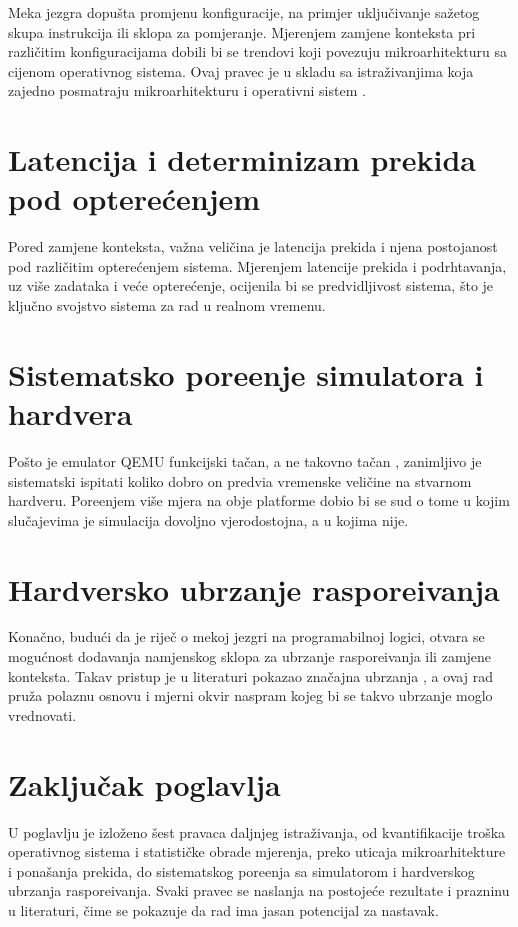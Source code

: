Meka jezgra dopu\v{s}ta promjenu konfiguracije, na primjer uklju\v{c}ivanje
sa\v{z}etog skupa instrukcija ili sklopa za pomjeranje. Mjerenjem zamjene
konteksta pri razli\v{c}itim konfiguracijama dobili bi se trendovi koji povezuju
mikroarhitekturu sa cijenom operativnog sistema. Ovaj pravec je u skladu sa
istra\v{z}ivanjima koja zajedno posmatraju mikroarhitekturu i operativni sistem
\citep{scheck2026coexploration}.

\section{Latencija i determinizam prekida pod optere\'cenjem}
\label{sec:pravci-prekidi}

Pored zamjene konteksta, va\v{z}na veli\v{c}ina je latencija prekida i njena
postojanost pod razli\v{c}itim optere\'cenjem sistema. Mjerenjem latencije
prekida i podrhtavanja, uz vi\v{s}e zadataka i ve\'ce optere\'cenje, ocijenila bi
se predvidljivost sistema, \v{s}to je klju\v{c}no svojstvo sistema za rad u
realnom vremenu.

\section{Sistematsko pore\dj{}enje simulatora i hardvera}
\label{sec:pravci-qemu}

Po\v{s}to je emulator QEMU funkcijski ta\v{c}an, a ne takovno ta\v{c}an
\citep{qemu}, zanimljivo je sistematski ispitati koliko dobro on predvi\dj{}a
vremenske veli\v{c}ine na stvarnom hardveru. Pore\dj{}enjem vi\v{s}e mjera na obje
platforme dobio bi se sud o tome u kojim slu\v{c}ajevima je simulacija dovoljno
vjerodostojna, a u kojima nije.

\section{Hardversko ubrzanje raspore\dj{}ivanja}
\label{sec:pravci-hardver}

Kona\v{c}no, budu\'ci da je rije\v{c} o mekoj jezgri na programabilnoj logici,
otvara se mogu\'cnost dodavanja namjenskog sklopa za ubrzanje raspore\dj{}ivanja
ili zamjene konteksta. Takav pristup je u literaturi pokazao zna\v{c}ajna
ubrzanja \citep{balas2023cv32rt}, a ovaj rad pru\v{z}a polaznu osnovu i mjerni
okvir naspram kojeg bi se takvo ubrzanje moglo vrednovati.

\section{Zaklju\v{c}ak poglavlja}
\label{sec:pravci-zakljucak}

U poglavlju je izlo\v{z}eno \v{s}est pravaca daljnjeg istra\v{z}ivanja, od
kvantifikacije tro\v{s}ka operativnog sistema i statisti\v{c}ke obrade mjerenja,
preko uticaja mikroarhitekture i pona\v{s}anja prekida, do sistematskog
pore\dj{}enja sa simulatorom i hardverskog ubrzanja raspore\dj{}ivanja. Svaki
pravec se naslanja na postoje\'ce rezultate i prazninu u literaturi, \v{c}ime se
pokazuje da rad ima jasan potencijal za nastavak.
